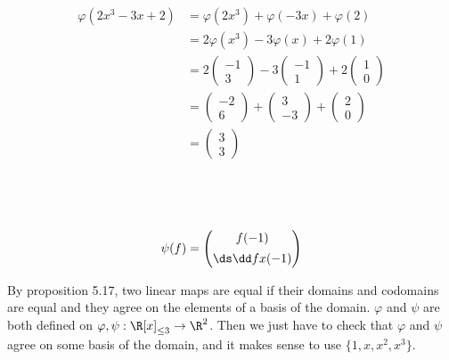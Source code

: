 \documentclass[a4paper]{article}
\begin{document}
\begin{align*}
\varphi(2x^3 - 3x + 2) &= \varphi(2x^3) + \varphi(-3x) + \varphi(2)\\[1ex]
&= 2 \varphi(x^3) - 3 \varphi(x) + 2 \varphi(1)\\[1ex]
&= 2 \begin{pmatrix}-1\\ 3\end{pmatrix} - 3 \begin{pmatrix}-1\\ 1\end{pmatrix} + 2 \begin{pmatrix}1\\ 0\end{pmatrix}\\[1ex]
&= \begin{pmatrix}-2\\ 6\end{pmatrix} + \begin{pmatrix}3\\ -3\end{pmatrix} + \begin{pmatrix}2\\ 0\end{pmatrix}\\[1ex]
&= \begin{pmatrix}3\\ 3\end{pmatrix}
\end{align*}

\subsection{~}

$$\psi(f) = \begin{pmatrix} f(-1) \\[1ex] \ds \dd fx (-1) \end{pmatrix}$$

By proposition 5.17, two linear maps are equal if their domains and codomains are equal and they agree on the elements of a basis of the domain. $\varphi$ and $\psi$ are both defined on $\varphi, \psi : \R[x]_{\le 3} \to \R^2$. Then we just have to check that $\varphi$ and $\psi$ agree on some basis of the domain, and it makes sense to use $\{ 1, x, x^2, x^3 \}$.
\end{document}
